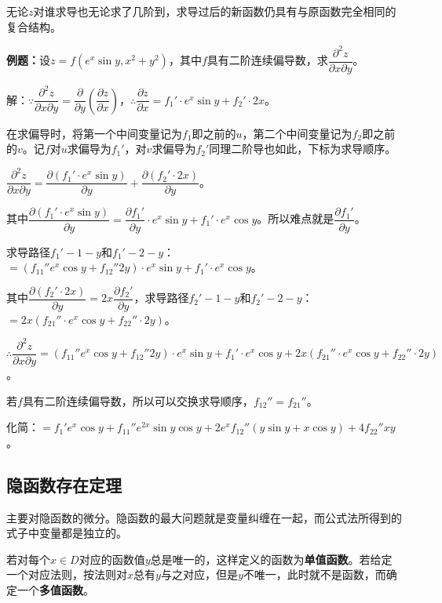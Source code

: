 \documentclass[UTF8, 12pt]{ctexart}
\begin{document}
        无论$z$对谁求导也无论求了几阶到，求导过后的新函数仍具有与原函数完全相同的复合结构。

        \textbf{例题：}设$z=f(e^x\sin y,x^2+y^2)$，其中$f$具有二阶连续偏导数，求$\dfrac{\partial^2z}{\partial x\partial y}$。

        解：$\because\dfrac{\partial^2z}{\partial x\partial y}=\dfrac{\partial}{\partial y}\left(\dfrac{\partial z}{\partial x}\right)$，$\therefore\dfrac{\partial z}{\partial x}=f_1'\cdot e^x\sin y+f_2'\cdot2x$。

        在求偏导时，将第一个中间变量记为$f_1$即之前的$u$，第二个中间变量记为$f_2$即之前的$v$。记$f$对$u$求偏导为$f_1'$，对$v$求偏导为$f_2'$同理二阶导也如此，下标为求导顺序。

        $\dfrac{\partial^2z}{\partial x\partial y}=\dfrac{\partial(f_1'\cdot e^x\sin y)}{\partial y}+\dfrac{\partial(f_2'\cdot2x)}{\partial y}$。

        其中$\dfrac{\partial(f_1'\cdot e^x\sin y)}{\partial y}=\dfrac{\partial f_1'}{\partial y}\cdot e^x\sin y+f_1'\cdot e^x\cos y$。所以难点就是$\dfrac{\partial f_1'}{\partial y}$。

        求导路径$f_1'-1-y$和$f_1'-2-y$：$=(f_{11}''e^x\cos y+f_{12}''2y)\cdot e^x\sin y+f_1'\cdot e^x\cos y$。

        其中$\dfrac{\partial(f_2'\cdot2x)}{\partial y}=2x\dfrac{\partial f_2'}{\partial y}$，求导路径$f_2'-1-y$和$f_2'-2-y$：$=2x(f_{21}''\cdot e^x\cos y+f_{22}''\cdot2y)$。

        $\therefore\dfrac{\partial^2z}{\partial x\partial y}=(f_{11}''e^x\cos y+f_{12}''2y)\cdot e^x\sin y+f_1'\cdot e^x\cos y+2x(f_{21}''\cdot e^x\cos y+f_{22}''\cdot2y)$。

        若$f$具有二阶连续偏导数，所以可以交换求导顺序，$f_{12}''=f_{21}''$。

        化简：$=f_1'e^x\cos y+f_{11}''e^{2x}\sin y\cos y+2e^xf_{12}''(y\sin y+x\cos y)+4f_{22}''xy$。

        \subsection{隐函数存在定理}

        主要对隐函数的微分。隐函数的最大问题就是变量纠缠在一起，而公式法所得到的式子中变量都是独立的。

        若对每个$x\in D$对应的函数值$y$总是唯一的，这样定义的函数为\textbf{单值函数}。若给定一个对应法则，按法则对$x$总有$y$与之对应，但是$y$不唯一，此时就不是函数，而确定一个\textbf{多值函数}。
\end{document}
